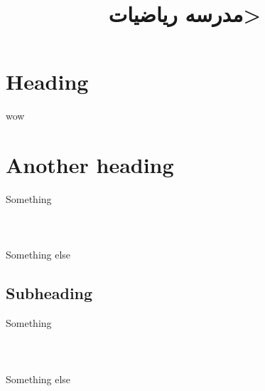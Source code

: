 \documentclass[a4paper]{exam}
\title{\<مدرسه رياضيات>}
\author{\class}
\date{\term}
\begin{document}
\maketitle

\section*{Heading}
    wow

\section*{Another heading}
    Something\\\\
    \noindent{}\\\\
    Something else

    \subsection*{Subheading}
        Something\\\\
        \noindent{}\\\\
        Something else
\end{document}
